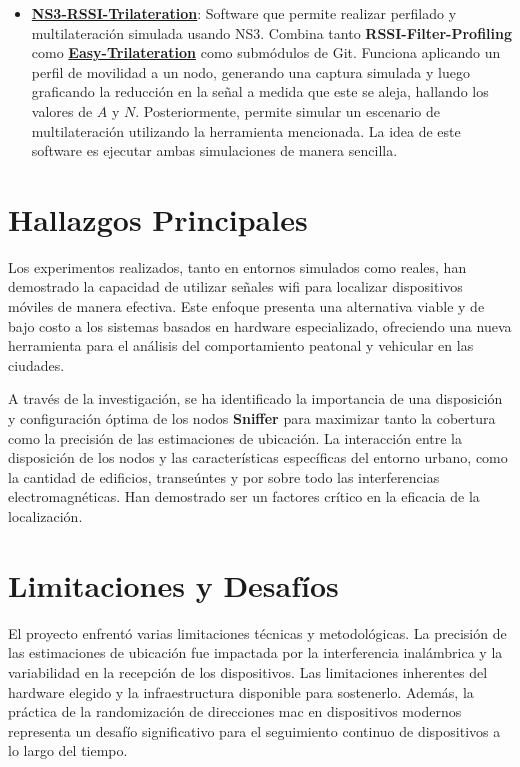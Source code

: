 \begin{itemize}
    \item \href{https://github.com/agusalex/ns3-rssi-trilateration}{\textbf{NS3-RSSI-Trilateration}}: Software que permite realizar perfilado y multilateración simulada usando NS3. Combina tanto \textbf{RSSI-Filter-Profiling} como \href{https://github.com/agusalex/easy-trilateration}{\textbf{Easy-Trilateration}} como submódulos de Git. Funciona aplicando un perfil de movilidad a un nodo, generando una captura simulada y luego graficando la reducción en la señal a medida que este se aleja, hallando los valores de \( A \) y \( N \). Posteriormente, permite simular un escenario de multilateración utilizando la herramienta mencionada. La idea de este software es ejecutar ambas simulaciones de manera sencilla.
\end{itemize}
\section{Hallazgos Principales}

Los experimentos realizados, tanto en entornos simulados como reales, han demostrado la capacidad de utilizar señales \acs{wifi} para localizar dispositivos móviles de manera efectiva. Este enfoque presenta una alternativa viable y de bajo costo a los sistemas basados en hardware especializado, ofreciendo una nueva herramienta para el análisis del comportamiento peatonal y vehicular en las ciudades.

A través de la investigación, se ha identificado la importancia de una disposición y configuración óptima de los nodos \textbf{Sniffer} para maximizar tanto la cobertura como la precisión de las estimaciones de ubicación. La interacción entre la disposición de los nodos y las características específicas del entorno urbano, como la cantidad de edificios, transeúntes y por sobre todo las interferencias electromagnéticas. Han demostrado ser un factores crítico en la eficacia de la localización.


\section{Limitaciones y Desafíos}

El proyecto enfrentó varias limitaciones técnicas y metodológicas. La precisión de las estimaciones de ubicación fue impactada por la interferencia inalámbrica y la variabilidad en la recepción de los dispositivos. Las limitaciones inherentes del hardware elegido y la infraestructura disponible para sostenerlo. Además, la práctica de la randomización de direcciones \acs{mac} en dispositivos modernos representa un desafío significativo para el seguimiento continuo de dispositivos a lo largo del tiempo.

